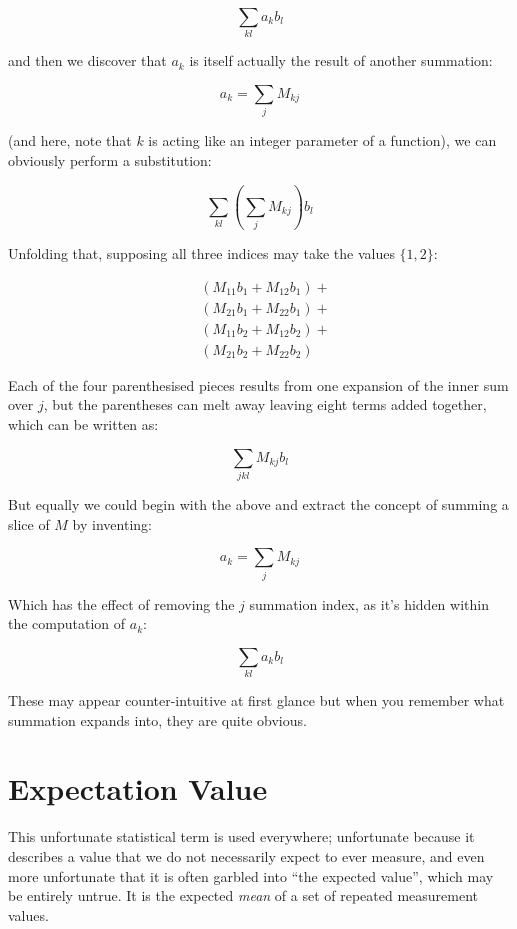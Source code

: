 $$
\sum_{kl} a_k b_l 
$$

and then we discover that $a_k$ is itself actually the result of another summation:

$$
a_k = \sum_{j} M_{kj}
$$

(and here, note that $k$ is acting like an integer parameter of a function), we can obviously perform a substitution:

$$
\sum_{kl} \left( \sum_{j} M_{kj} \right) b_l 
$$

Unfolding that, supposing all three indices may take the values $\{1, 2\}$:

\begin{equation}
    \begin{aligned}
        & (M_{11} b_1 + M_{12} b_1) + \\
        & (M_{21} b_1 + M_{22} b_1) + \\
        & (M_{11} b_2 + M_{12} b_2) + \\
        & (M_{21} b_2 + M_{22} b_2)            
    \end{aligned}
\end{equation}

Each of the four parenthesised pieces results from one expansion of the inner sum over $j$, but the parentheses can melt away leaving eight terms added together, which can be written as:

$$
\sum_{jkl} M_{kj} b_l
$$

But equally we could begin with the above and extract the concept of summing a slice of $M$ by inventing:

$$
a_k = \sum_{j} M_{kj}
$$

Which has the effect of removing the $j$ summation index, as it's hidden within the computation of $a_k$:

$$
\sum_{kl} a_k b_l 
$$

These may appear counter-intuitive at first glance but when you remember what summation expands into, they are quite obvious.

\section{Expectation Value} \label{sec:expectation-value}

This unfortunate statistical term is used everywhere; unfortunate because it describes a value that we do not necessarily expect to ever measure, and even more unfortunate that it is often garbled into ``the expected value'', which may be entirely untrue. It is the expected \textit{mean} of a set of repeated measurement values.

